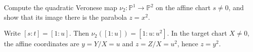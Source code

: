 \begin{problem}\label{prob:vi36-08}
Compute the quadratic Veronese map \(\nu_2:\mathbb P^1\to\mathbb P^2\) on the affine chart \(s\ne0\), and show that its image there is the parabola \(z=x^2\).
\begin{solution}
Write \([s:t]=[1:u]\).  Then \(\nu_2([1:u])=[1:u:u^2]\).  In the target chart \(X\ne0\), the affine coordinates are \(y=Y/X=u\) and \(z=Z/X=u^2\), hence \(z=y^2\).
\end{solution}
\end{problem}
